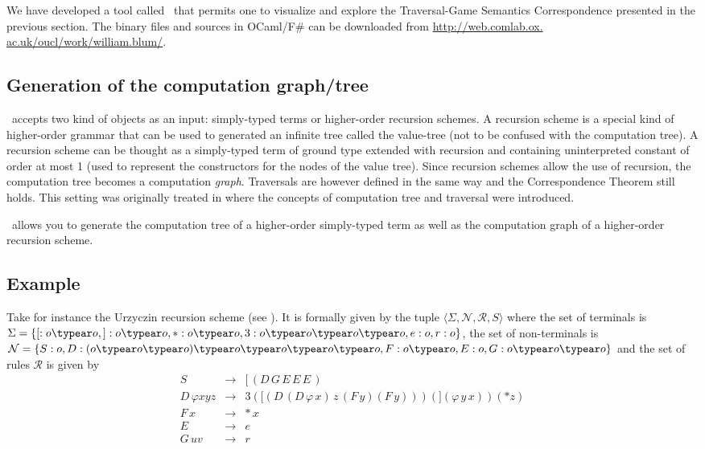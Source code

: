 We have developed a tool called \toolname\ that permits one to visualize and explore the Traversal-Game Semantics Correspondence presented in the previous section. The binary files and sources in OCaml/F\# can be downloaded from \url{http://web.comlab.ox. ac.uk/oucl/work/william.blum/}.

\subsection{Generation of the computation graph/tree}

\toolname\ accepts two kind of objects as an input: simply-typed terms or higher-order recursion schemes. A recursion scheme is a special kind of higher-order grammar that can be used to generated an infinite tree called the value-tree (not to be confused with the computation tree). A recursion scheme can be thought as a simply-typed term of ground type extended with recursion and containing uninterpreted constant of order at most 1 (used to represent the constructors for the nodes of the value tree). Since recursion schemes allow the use of recursion, the computation tree becomes a computation \emph{graph}. Traversals are however defined in the same way and the Correspondence Theorem still holds. This setting was originally treated in \cite{OngLics2006} where the concepts of computation tree and traversal were introduced.


\toolname\ allows you to generate the computation tree of a higher-order simply-typed term as well as the computation graph of a higher-order recursion scheme.

\subsection{Example}

Take for instance the Urzyczin recursion scheme (see \cite{demirandathesis}). It is formally given by the tuple $\langle \Sigma, \mathcal{N}, \mathcal{R}, S \rangle $ where the set of terminals is $\Sigma = \{[:o\typear o,
    ]:o \typear o,*:o \typear o, 3:o \typear o \typear o \typear o, e:o,
    r:o\}$, the set of non-terminals is
 $\mathcal{N} = \{ S:o,
    D:(o \typear o \typear o) \typear o \typear o \typear o \typear
    o,
    F:o \typear o,
    E:o,
    G:o \typear o \typear o \}$ and the set of rules $\mathcal{R}$ is given by
\[\begin{array}{rll}
   S\, & \rightarrow & [\, (D\, G\, E\, E\, E\,) \\
    D\, \varphi x y z & \rightarrow & 3 ([ (D\, (D\, \varphi\, x)\, z\, (F\, y) (F\, y))) (] (\varphi\, y\, x)) (* z) \\
    F\, x & \rightarrow & *\, x \\
    E\, & \rightarrow & e \\
    G\, u v & \rightarrow & r
\end{array}\]


